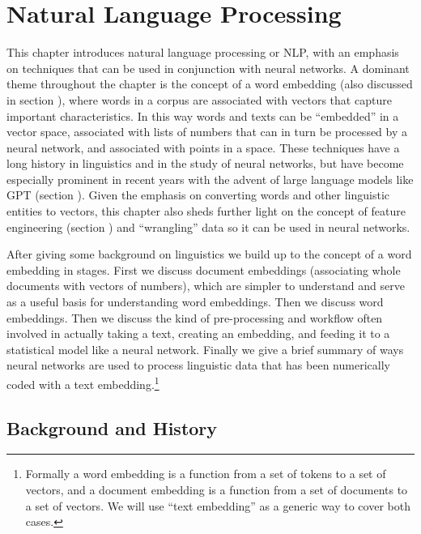 \chapter{Natural Language Processing}\label{ch_nlp}


This chapter introduces natural language processing or NLP, with an emphasis on techniques that can be used in conjunction with neural networks. A dominant theme throughout the chapter is the concept of a word embedding (also discussed in section ), where words in a corpus are associated with vectors that capture important characteristics.  In this way words and texts can be ``embedded'' in a vector space, associated with lists of numbers that can in turn be processed by a neural network, and associated with points in a space. These techniques have a long history in linguistics and in the study of neural networks, but have become especially prominent in recent years with the advent of large language models like GPT (section ). Given the emphasis on converting words and other linguistic entities to vectors, this chapter also sheds further light on the concept of feature engineering (section ) and ``wrangling'' data so it can be used in neural networks.

After giving some background on linguistics we build up to the concept of a word embedding in stages. First we discuss document embeddings (associating whole documents with vectors of numbers), which are simpler to understand and serve as a useful basis for understanding word embeddings.  Then we discuss word embeddings. Then we discuss the kind of pre-processing and workflow often involved in actually taking a text, creating an embedding, and feeding it to a statistical model like a neural network. Finally we give a brief summary of ways neural networks are used to process linguistic data that has been numerically coded with a text embedding.\footnote{Formally a word embedding is a function from a set of tokens to a set of vectors, and a document embedding is a function from a set of documents to a set of vectors.  We will use ``text embedding'' as a generic way to cover both cases.}

\section{Background and History}

